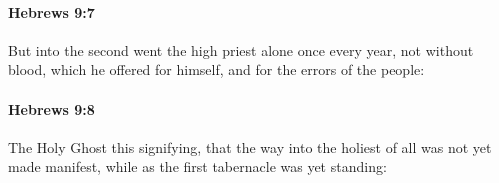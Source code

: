 		\paragraph{Hebrews 9:7} %
			\label{HEBREWS-9-7}

			But into the second went the high priest alone once every year, not without blood, which he offered for himself, and for the errors of the people:

			\begin{framed}
			\scriptsize
				\begin{compactdesc}
					\item[SBLG] 
				\end{compactdesc}
			\end{framed}

		\paragraph{Hebrews 9:8} %
			\label{HEBREWS-9-8}

			The Holy Ghost this signifying, that the way into the holiest of all was not yet made manifest, while as the first tabernacle was yet standing:


